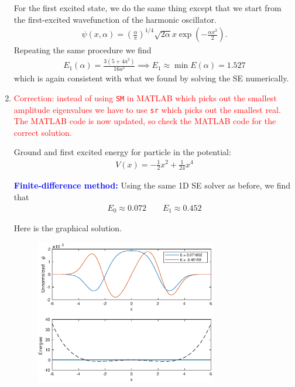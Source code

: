 \documentclass{article}
\theoremstyle{definition}
\newcommand{\al}{\alpha}
\newcommand{\f}[2]{\frac{#1}{#2}}
\newcommand{\lp}{\left(}
\newcommand{\rp}{\right)}
\begin{document}
\begin{enumerate}[label=(\alph*)]
	For the first excited state, we do the same thing except that we start from the first-excited wavefunction of the harmonic oscillator. 
	\begin{align*}
	\psi(x,\al) = \lp \f{\al}{\pi} \rp^{1/4}\sqrt{2 \al} x \exp\lp -\f{\al x^2}{2} \rp.
	\end{align*}
	Repeating the same procedure we find 
	\begin{align*}
	\boxed{E_1(\al) = \f{3(5+4a^3)}{16a^2} \implies E_1 \approx \min E(\al) =   1.527}
	\end{align*}
	which is again consistent with what we found by solving the SE numerically. 
	
	
	
	
	
	\item \textcolor{red}{Correction: instead of using \texttt{SM} in MATLAB which picks out the smallest amplitude eigenvalues we have to use \texttt{sr} which picks out the smallest real. The MATLAB code is now updated, so check the MATLAB code for the correct solution.}
	
	
	
	Ground and first excited energy for particle in the potential:
	\begin{align*}
	V(x) = -\f{1}{2}x^2 + \f{1}{24}x^4
	\end{align*}
	
	\textbf{\textcolor{blue}{Finite-difference method:}} Using the same 1D SE solver as before, we find that
	\begin{align*}
	\boxed{E_0 \approx 0.072} \quad\quad \boxed{E_1 \approx 0.452}
	\end{align*}
	
	Here is the graphical solution. 
	\begin{figure}[!htb]
		\centering
		\includegraphics[width=0.75\textwidth]{problem3b.eps}
	\end{figure}
	

\end{enumerate}
\end{document}
